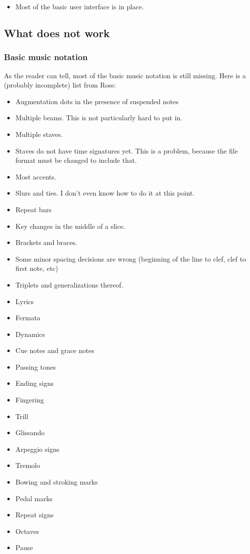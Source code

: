 \begin{itemize}
\item Most of the basic user interface is in place.
\end{itemize}

\subsection{What does not work}

\subsubsection{Basic music notation}

As the reader can tell, most of the basic music notation is still
missing.  Here is a (probably incomplete) list from Ross:

\begin{itemize}
\item Augmentation dots in the presence of suspended notes 
\item Multiple beams.  This is not particularly hard to put in.  
\item Multiple staves.
\item Staves do not have time signatures yet.  This is a problem,
  because the file format must be changed to include that.
\item Most accents. 
\item Slurs and ties.  I don't even know how to do it at this point. 
\item Repeat bars
\item Key changes in the middle of a slice. 
\item Brackets and braces.
\item Some minor spacing decisions are wrong (beginning of the line to
  clef, clef to first note, etc)
\item Triplets and generalizations thereof.
\item Lyrics
\item Fermata
\item Dynamics
\item Cue notes and grace notes
\item Passing tones
\item Ending signs
\item Fingering
\item Trill
\item Glissando
\item Arpeggio signs
\item Tremolo
\item Bowing and stroking marks
\item Pedal marks
\item Repeat signs
\item Octaves
\item Pause
\end{itemize}

